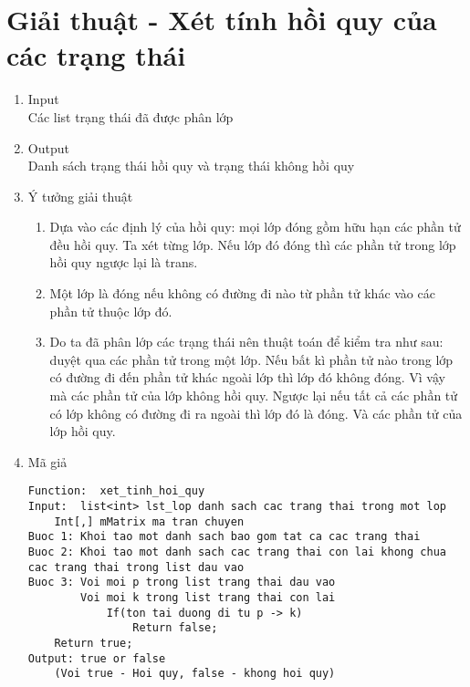 \section{Giải thuật - Xét tính hồi quy của các trạng thái}
	\begin{enumerate}
  		\item Input \\
  			Các list trạng thái đã được phân lớp
  		\item Output \\
  			Danh sách trạng thái hồi quy và trạng thái không hồi quy
  		\item Ý tưởng giải thuật 
  			\begin{enumerate}
  				\item Dựa vào các định lý của hồi quy: mọi lớp đóng gồm hữu hạn các phần tử đều hồi quy. Ta xét từng lớp. 								Nếu lớp đó đóng thì các phần tử trong lớp hồi quy ngược lại là trans.
				\item Một lớp là đóng nếu không có đường đi nào từ phần tử khác vào các phần tử thuộc lớp đó. 
				\item Do ta đã phân lớp các trạng thái nên thuật toán để kiểm tra như sau: duyệt qua các phần tử trong một 						lớp. Nếu bất kì phần tử nào trong lớp có đường đi đến phần tử khác ngoài lớp thì lớp đó không đóng. Vì vậy 						mà các phần tử của lớp không hồi quy. Ngược lại nếu tất cả các phần tử có lớp không có đường đi ra ngoài thì 				lớp đó là đóng. Và các phần tử của lớp hồi quy.

  			\end{enumerate}
  		\item Mã giả
  			\begin{lstlisting}
Function:  xet_tinh_hoi_quy
Input:  list<int> lst_lop danh sach cac trang thai trong mot lop
	Int[,] mMatrix ma tran chuyen
Buoc 1: Khoi tao mot danh sach bao gom tat ca cac trang thai
Buoc 2: Khoi tao mot danh sach cac trang thai con lai khong chua cac trang thai trong list dau vao
Buoc 3: Voi moi p trong list trang thai dau vao
		Voi moi k trong list trang thai con lai
			If(ton tai duong di tu p -> k)
				Return false;
	Return true;
Output: true or false
	(Voi true - Hoi quy, false - khong hoi quy)

  			\end{lstlisting}
	\end{enumerate}